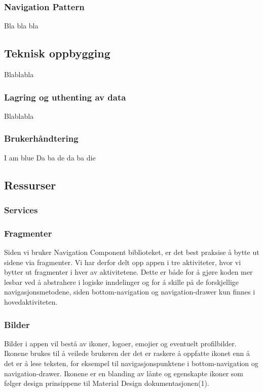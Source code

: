 \subsubsection{Navigation Pattern}
Bla bla bla

\subsection{Teknisk oppbygging}
Blablabla

\subsubsection{Lagring og uthenting av data}
Blablabla

\subsubsection{Brukerhåndtering}
I am blue
Da ba de da ba die

\subsection{Ressurser}
\subsubsection{Services}

\subsubsection{Fragmenter}
Siden vi bruker Navigation Component biblioteket, er det best praksise å bytte ut sidene via fragmenter. Vi har derfor delt opp appen i tre aktiviteter, hvor vi bytter ut fragmenter i hver av aktivitetene. Dette er både for å gjøre koden mer lesbar ved å abstrahere i logiske inndelinger og for å skille på de forskjellige navigasjonsmetodene, siden bottom-navigation og navigation-drawer kun finnes i hovedaktiviteten.

\subsubsection{Bilder}
Bilder i appen vil bestå av ikoner, logoer, emojier og eventuelt profilbilder. Ikonene brukes til å veilede brukeren der det er raskere å oppfatte ikonet enn å det er å lese teksten, for eksempel til navigasjonspunktene i bottom-navigation og navigation-drawer. Ikonene er en blanding av lånte og egenskapte ikoner som følger design prinsippene til Material Design dokumentasjonen(1).

